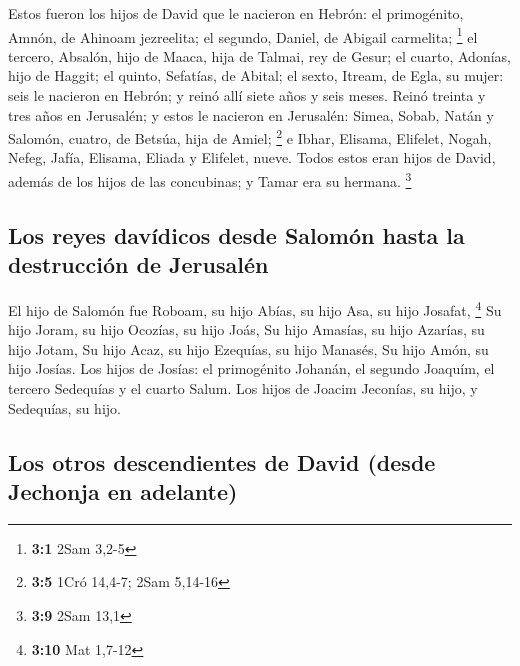 \begin{paracol}{2}
 Estos fueron los hijos de David que le nacieron en
Hebrón: el primogénito, Amnón, de Ahinoam jezreelita; el segundo,
Daniel, de Abigail carmelita; \footnote{\textbf{3:1} 2Sam 3,2-5}
 el tercero, Absalón, hijo de Maaca, hija de Talmai, rey
de Gesur; el cuarto, Adonías, hijo de Haggit;  el quinto,
Sefatías, de Abital; el sexto, Itream, de Egla, su mujer: 
seis le nacieron en Hebrón; y reinó allí siete años y seis meses. Reinó
treinta y tres años en Jerusalén;  y estos le nacieron en
Jerusalén: Simea, Sobab, Natán y Salomón, cuatro, de Betsúa, hija de
Amiel; \footnote{\textbf{3:5} 1Cró 14,4-7; 2Sam 5,14-16} 
e Ibhar, Elisama, Elifelet,  Nogah, Nefeg, Jafía,
 Elisama, Eliada y Elifelet, nueve.  Todos
estos eran hijos de David, además de los hijos de las concubinas; y
Tamar era su hermana. \footnote{\textbf{3:9} 2Sam 13,1}

\hypertarget{los-reyes-davuxeddicos-desde-salomuxf3n-hasta-la-destrucciuxf3n-de-jerusaluxe9n}{%
\subsection{Los reyes davídicos desde Salomón hasta la destrucción de
Jerusalén}\label{los-reyes-davuxeddicos-desde-salomuxf3n-hasta-la-destrucciuxf3n-de-jerusaluxe9n}}

 El hijo de Salomón fue Roboam, su hijo Abías, su hijo
Asa, su hijo Josafat, \footnote{\textbf{3:10} Mat 1,7-12}
 Su hijo Joram, su hijo Ocozías, su hijo Joás,
 Su hijo Amasías, su hijo Azarías, su hijo Jotam,
 Su hijo Acaz, su hijo Ezequías, su hijo Manasés,
 Su hijo Amón, su hijo Josías.  Los hijos
de Josías: el primogénito Johanán, el segundo Joaquím, el tercero
Sedequías y el cuarto Salum.  Los hijos de Joacim
Jeconías, su hijo, y Sedequías, su hijo.

\hypertarget{los-otros-descendientes-de-david-desde-jechonja-en-adelante}{%
\subsection{Los otros descendientes de David (desde Jechonja en
adelante)}\label{los-otros-descendientes-de-david-desde-jechonja-en-adelante}}


\end{paracol}
